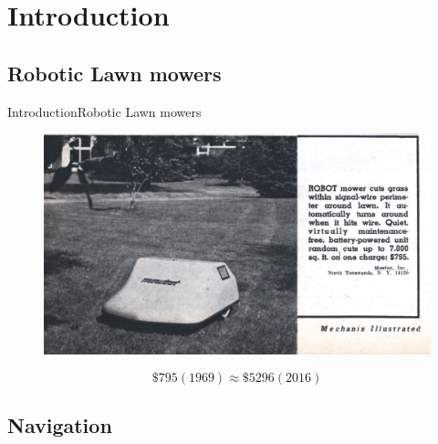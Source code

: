 \section{Introduction}
\subsection{Robotic Lawn mowers}

\begin{frame}{Introduction}{Robotic Lawn mowers}
  \begin{figure}
    \includegraphics[width=\linewidth]{Pictures/mowbot.jpg}
  \end{figure}
\pause
$$\$795 (1969) \approx \$5296 (2016)$$
\end{frame}

\subsection{Navigation}

